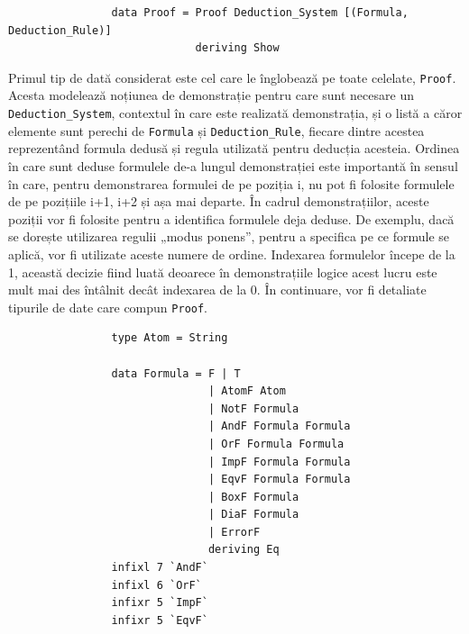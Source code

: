 \documentclass[12pt, openany]{book}
\begin{document}
            \begin{lstlisting}
                data Proof = Proof Deduction_System [(Formula, Deduction_Rule)]
                             deriving Show
            \end{lstlisting}

            \par{}
                Primul tip de dată considerat este cel care le înglobează pe toate celelate, \texttt{Proof}. Acesta 
                modelează noțiunea de demonstrație pentru care sunt necesare un \texttt{Deduction\_System}, contextul în 
                care este realizată demonstrația, și o listă a căror elemente sunt perechi de \texttt{Formula} și 
                \texttt{Deduction\_Rule}, fiecare dintre acestea reprezentând formula dedusă și regula utilizată pentru 
                deducția acesteia. Ordinea în care sunt deduse formulele de-a lungul demonstrației este importantă în 
                sensul în care, pentru demonstrarea formulei de pe poziția i, nu pot fi folosite formulele de pe 
                pozițiile i+1, i+2 și așa mai departe. În cadrul demonstrațiilor, aceste poziții vor fi folosite pentru 
                a identifica formulele deja deduse. De exemplu, dacă se dorește utilizarea regulii „modus ponens”, 
                pentru a specifica pe ce formule se aplică, vor fi utilizate aceste numere de ordine. Indexarea 
                formulelor începe de la 1, această decizie fiind luată deoarece în demonstrațiile logice acest lucru 
                este mult mai des întâlnit decât indexarea de la 0. În continuare, vor fi detaliate tipurile 
                de date care compun \texttt{Proof}.

            \begin{lstlisting}
                type Atom = String

                data Formula = F | T
                               | AtomF Atom
                               | NotF Formula 
                               | AndF Formula Formula
                               | OrF Formula Formula
                               | ImpF Formula Formula
                               | EqvF Formula Formula
                               | BoxF Formula
                               | DiaF Formula
                               | ErrorF
                               deriving Eq
                infixl 7 `AndF`
                infixl 6 `OrF`
                infixr 5 `ImpF`
                infixr 5 `EqvF`
            \end{lstlisting}
\end{document}
